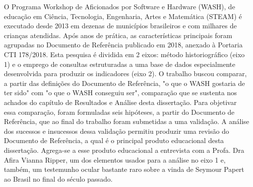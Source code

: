 
\begin{resumoutfpr}%

O  Programa Workshop de Aficionados por Software e Hardware (WASH), de educação em Ciência, Tecnologia, Engenharia, Artes e Matemática (STEAM) é executado desde 2013 em dezenas de municípios brasileiros e com milhares de crianças atendidas. Após anos de prática, as características principais foram agrupadas no Documento de Referência publicado em 2018, anexado à Portaria CTI 178/2018. Esta pesquisa é dividida em 2 eixos: método historiográfico (eixo 1) e o emprego de consultas estruturadas a uma base de dados especialmente desenvolvida para produzir os indicadores (eixo 2). O trabalho buscou comparar, a partir das definições do Documento de Referência, "o que o WASH gostaria de ter sido" com "o que o WASH conseguiu ser", comparação que se sustenta nos achados do capítulo de Resultados e Análise desta dissertação. Para objetivar essa comparação, foram formuladas seis hipóteses, a partir do Documento de Referência, que ao final do trabalho foram submetidas a uma validação.  A análise dos sucessos e insucessos dessa validação permitiu produzir uma revisão do Documento de Referência, a qual é o principal produto educacional desta dissertação. Agrega-se a esse produto educacional a entrevista com a Profa. Dra Afira Vianna Ripper, um dos elementos usados para a análise no eixo 1 e, também, um testemunho ocular bastante raro sobre a vinda de Seymour Papert ao Brasil no final do século passado.

\end{resumoutfpr}
